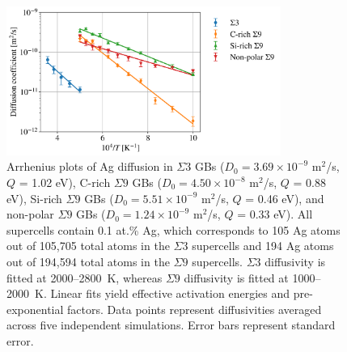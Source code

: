 \documentclass[%
preprint,
amsmath,amssymb,
aps,
]{revtex4-2}
\newcommand{\?}{\stackrel{?}{=}}
\begin{document}
\begin{figure}[h!]
\centering
\includegraphics[width=0.8\textwidth]{Arrhenius_plot_all.png}
\caption{Arrhenius plots of Ag diffusion in $\Sigma 3$ GBs ($D_0 = 3.69 \times 10^{-9}$ m$^2$/s, $Q$ = 1.02 eV), C-rich $\Sigma 9$ GBs ($D_0 = 4.50 \times 10^{-8}$ m$^2$/s, $Q$ = 0.88 eV), Si-rich $\Sigma 9$ GBs ($D_0 = 5.51 \times 10^{-9}$ m$^2$/s, $Q$ = 0.46 eV), and non-polar $\Sigma 9$ GBs ($D_0 = 1.24 \times 10^{-9}$ m$^2$/s, $Q$ = 0.33 eV). All supercells contain 0.1 at.\% Ag, which corresponds to 105 Ag atoms out of 105,705 total atoms in the $\Sigma 3$ supercells and 194 Ag atoms out of 194,594 total atoms in the $\Sigma 9$ supercells. $\Sigma 3$ diffusivity is fitted at 2000--2800~K, whereas $\Sigma 9$ diffusivity is fitted at 1000--2000~K. Linear fits yield effective activation energies and pre-exponential factors. Data points represent diffusivities averaged across five independent simulations. Error bars represent standard error.}
\label{Fig:Sigma}
\end{figure}
\end{document}
